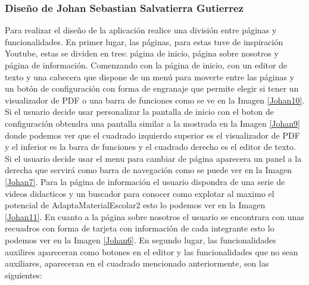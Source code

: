 \subsubsection{Diseño de Johan Sebastian Salvatierra Gutierrez}
Para realizar el diseño de la aplicación realice una división entre páginas y funcionalidades. 
En primer lugar, las páginas, para estas tuve de inspiración Youtube, estas se dividen en tres: página de inicio, página sobre nosotros y página de información. Comenzando con la página de inicio, con un editor de texto y una cabecera que dispone de un menú para moverte entre las páginas y un botón de configuración con forma de engranaje que permite elegir si tener un visualizador de PDF o una barra de funciones como se ve en la Imagen \ref{Johan10}. Si el usuario decide usar personalizar la pantalla de inicio con el boton de configuración obtendra una pantalla similar a la mostrada en la Imagen \ref{Johan9} donde podemos ver que el cuadrado izquierdo superior es el visualizador de PDF y el inferior es la barra de funciones y el cuadrado derecho es el editor de texto. Si el usuario decide usar el menu para cambiar de página aparecera un panel a la derecha que servirá como barra de navegación como se puede ver en la Imagen \ref{Johan7}. Para la página de información el usuario dispondra de una serie de videos didacticos y un buscador para conocer como explotar al maximo el potencial de AdaptaMaterialEscolar2 esto lo podemos ver en la Imagen \ref{Johan11}. En cuanto a la página sobre nosotros el usuario se encontrara con unas recuadros con forma de tarjeta con información de cada integrante esto lo podemos ver en la Imagen \ref{Johan6}.
En segundo lugar, las funcionalidades auxilires apareceran como botones en el editor y las funcionalidades que no sean auxiliares, apareceran en el cuadrado mencionado anteriormente, son las siguientes:
